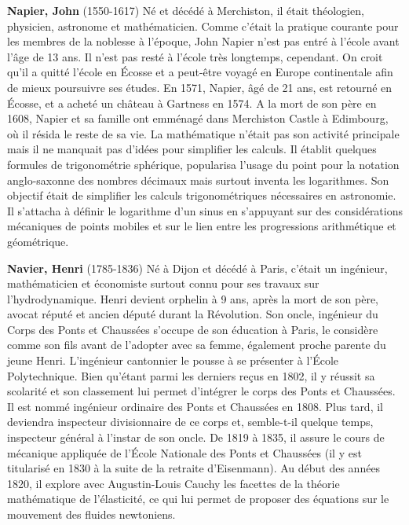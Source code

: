 {}
\label{sec:N}

\textbf{Napier, John} (1550-1617) Né et décédé à Merchiston, il était  théologien, physicien, astronome et mathématicien. Comme c'était la pratique courante pour les membres de la noblesse à l'époque, John Napier n'est pas entré à l'école avant l'âge de 13 ans. Il n'est pas resté à l'école très longtemps, cependant. On croit qu'il a quitté l'école en Écosse et a peut-être voyagé en Europe continentale afin de mieux poursuivre ses études. En 1571, Napier, âgé de 21 ans, est retourné en Écosse, et a acheté un château à Gartness en 1574. A la mort de son père en 1608, Napier et sa famille ont emménagé dans Merchiston Castle à Edimbourg, où il résida le reste de sa vie. La mathématique n'était pas son activité principale mais il ne manquait pas d'idées pour simplifier les calculs. Il établit quelques formules de trigonométrie sphérique, popularisa l'usage du point pour la notation anglo-saxonne des nombres décimaux mais surtout inventa les logarithmes. Son objectif était de simplifier les calculs trigonométriques nécessaires en astronomie. Il s'attacha à définir le logarithme d'un sinus en s'appuyant sur des considérations mécaniques de points mobiles et sur le lien entre les progressions arithmétique et géométrique.

\textbf{Navier, Henri} (1785-1836) Né à Dijon et décédé à Paris, c'était un ingénieur, mathématicien et économiste surtout connu pour ses travaux sur l'hydrodynamique. Henri devient orphelin à 9 ans, après la mort de son père, avocat réputé et ancien député durant la Révolution. Son oncle, ingénieur du Corps des Ponts et Chaussées s'occupe de son éducation à Paris, le considère comme son fils avant de l'adopter avec sa femme, également proche parente du jeune Henri. L'ingénieur cantonnier le pousse à se présenter à l'École Polytechnique. Bien qu'étant parmi les derniers reçus en 1802, il y réussit sa scolarité et son classement lui permet d'intégrer le corps des Ponts et Chaussées. Il est nommé ingénieur ordinaire des Ponts et Chaussées en 1808. Plus tard, il deviendra inspecteur divisionnaire de ce corps et, semble-t-il quelque temps, inspecteur général à l'instar de son oncle. De 1819 à 1835, il assure le cours de mécanique appliquée de l'École Nationale des Ponts et Chaussées (il y est titularisé en 1830 à la suite de la retraite d'Eisenmann). Au début des années 1820, il explore avec Augustin-Louis Cauchy les facettes de la théorie mathématique de l'élasticité, ce qui lui permet de proposer des équations sur le mouvement des fluides newtoniens.

